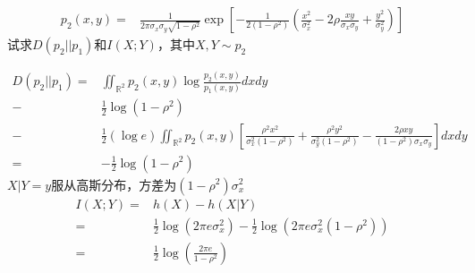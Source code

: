 \documentclass[a4paper]{article}
\begin{document}
\begin{enumerate}
\begin{align*}
p_2(x,y)=& \frac{1}{2\pi \sigma_x\sigma_y\sqrt{1-\rho^2}}\exp[-\frac{1}{2(1-\rho^2)}(\frac{x^2}{\sigma_x^2}-2\rho\frac{xy}{\sigma_x\sigma_y}+\frac{y^2}{\sigma_y^2})]
\end{align*}
试求$D(p_2||p_1)$和$I(X;Y)$，其中$X,Y\sim p_2$
\begin{solution}
\begin{align*}
D(p_2||p_1) = & \iint_{\mathbb{R}^2} p_2(x,y)\log \frac{p_2(x,y)}{p_1(x,y)}dxdy \\
 -&\frac{1}{2}\log(1-\rho^2)\\
-&\frac{1}{2}(\log e)\iint_{\mathbb{R}^2} p_2(x,y)\left[\frac{\rho^2 x^2}{\sigma_x^2(1-\rho^2)}+\frac{\rho^2 y^2}{\sigma_y^2(1-\rho^2)}-\frac{2\rho xy}{(1-\rho^2)\sigma_x\sigma_y}\right]dxdy\\
=&-\frac{1}{2}\log(1-\rho^2)
\end{align*}
$X|Y=y$服从高斯分布，方差为$(1-\rho^2)\sigma_x^2$
\begin{align*}
I(X;Y) = & h(X)-h(X|Y)\\
= & \frac{1}{2}\log(2\pi e \sigma_x^2) - \frac{1}{2}\log(2\pi e \sigma_x^2(1-\rho^2))\\
= & \frac{1}{2}\log(\frac{2\pi e}{1-\rho^2})
\end{align*}

\end{solution}

\end{enumerate}
\end{document}
